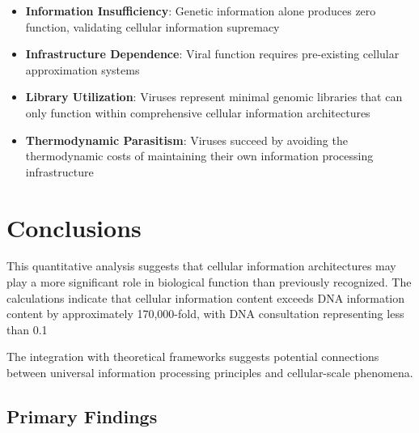 \documentclass[12pt,a4paper]{article}
\begin{document}
\begin{itemize}
\item \textbf{Information Insufficiency}: Genetic information alone produces zero function, validating cellular information supremacy
\item \textbf{Infrastructure Dependence}: Viral function requires pre-existing cellular approximation systems
\item \textbf{Library Utilization}: Viruses represent minimal genomic libraries that can only function within comprehensive cellular information architectures
\item \textbf{Thermodynamic Parasitism}: Viruses succeed by avoiding the thermodynamic costs of maintaining their own information processing infrastructure
\end{itemize}

\section{Conclusions}

This quantitative analysis suggests that cellular information architectures may play a more significant role in biological function than previously recognized. The calculations indicate that cellular information content exceeds DNA information content by approximately 170,000-fold, with DNA consultation representing less than 0.1%

The integration with theoretical frameworks suggests potential connections between universal information processing principles and cellular-scale phenomena.

\subsection{Primary Findings}
\end{document}
